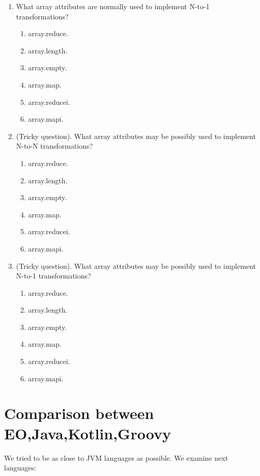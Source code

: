\documentclass[12pt]{book}
\begin{document}
\begin{enumerate}
    \item What array attributes are normally used to implement N-to-1 transformations?
    \begin{enumerate}
        \item array.reduce.
        \item array.length.
        \item array.empty.
        \item array.map.
        \item array.reducei.
        \item array.mapi.
    \end{enumerate}
    
    \item (Tricky question). What array attributes may be possibly used to implement N-to-N transformations?
    \begin{enumerate}
        \item array.reduce.
        \item array.length.
        \item array.empty.
        \item array.map.
        \item array.reducei.
        \item array.mapi.
    \end{enumerate}
    
    \item (Tricky question). What array attributes may be possibly used to implement N-to-1 transformations? 
    \begin{enumerate}
        \item array.reduce.
        \item array.length.
        \item array.empty.
        \item array.map.
        \item array.reducei.
        \item array.mapi.
    \end{enumerate}
\end{enumerate}


\chapter{Comparison between EO,Java,Kotlin,Groovy}
We tried to be as close to JVM languages as possible.
We examine next languages:
\end{document}
